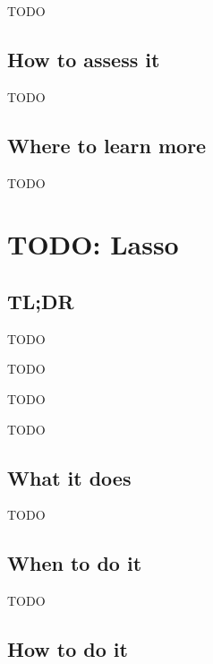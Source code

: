 \documentclass[
]{book}
\providecommand{\tightlist}{%
  \setlength{\itemsep}{0pt}\setlength{\parskip}{0pt}}
\begin{document}
TODO

\hypertarget{how-to-assess-it-12}{%
\section{How to assess it}\label{how-to-assess-it-12}}

TODO

\hypertarget{where-to-learn-more-12}{%
\section{Where to learn more}\label{where-to-learn-more-12}}

TODO

\hypertarget{lasso}{%
\chapter{TODO: Lasso}\label{lasso}}

\hypertarget{tldr-13}{%
\section{TL;DR}\label{tldr-13}}

\begin{description}
\tightlist
\item[What it does]
TODO
\item[When to do it]
TODO
\item[How to do it]
TODO
\item[How to assess it]
TODO
\end{description}

\hypertarget{what-it-does-13}{%
\section{What it does}\label{what-it-does-13}}

TODO

\hypertarget{when-to-do-it-13}{%
\section{When to do it}\label{when-to-do-it-13}}

TODO

\hypertarget{how-to-do-it-13}{%
\section{How to do it}\label{how-to-do-it-13}}
\end{document}
